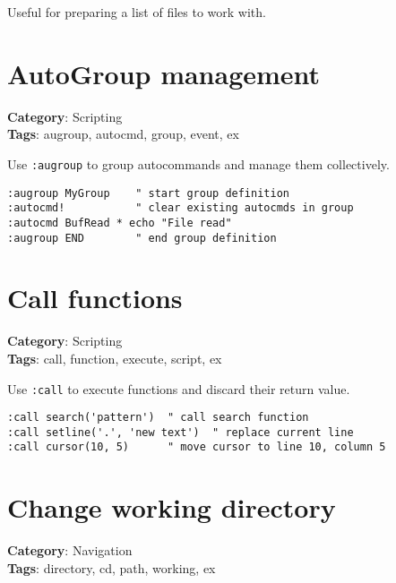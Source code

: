 {{{{{{Useful for preparing a list of files to work with.

\section{AutoGroup management}

\textbf{Category}: Scripting\\ \textbf{Tags}: augroup, autocmd, group, event, ex
\vspace{0.5cm}

Use {\footnotesize \Verb§:augroup§} to group autocommands and manage them collectively.

\begin{Exa*}{}
\begin{Verbatim}[fontsize=\footnotesize, breaklines, breakanywhere]
:augroup MyGroup    " start group definition
:autocmd!           " clear existing autocmds in group
:autocmd BufRead * echo "File read"
:augroup END        " end group definition
\end{Verbatim}
\end{Exa*}

\section{Call functions}

\textbf{Category}: Scripting\\ \textbf{Tags}: call, function, execute, script, ex
\vspace{0.5cm}

Use {\footnotesize \Verb§:call§} to execute functions and discard their return value.

\begin{Exa*}{}
\begin{Verbatim}[fontsize=\footnotesize, breaklines, breakanywhere]
:call search('pattern')  " call search function
:call setline('.', 'new text')  " replace current line
:call cursor(10, 5)      " move cursor to line 10, column 5
\end{Verbatim}
\end{Exa*}

\section{Change working directory}

\textbf{Category}: Navigation\\ \textbf{Tags}: directory, cd, path, working, ex
\vspace{0.5cm}

}}}}}}
